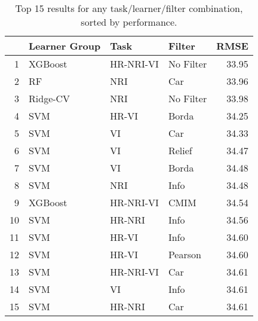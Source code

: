 \begin{table}[h!]
\centering
\caption{Top 15 results for any task/learner/filter combination, sorted by performance.} 
\label{tab:perf-top-15}
\begin{tabular}{rlllr}
  \hline
 & Learner Group & Task & Filter & RMSE \\ 
  \hline
1 & XGBoost & HR-NRI-VI & No Filter & 33.95 \\ 
  2 & RF & NRI & Car & 33.96 \\ 
  3 & Ridge-CV & NRI & No Filter & 33.98 \\ 
  4 & SVM & HR-VI & Borda & 34.25 \\ 
  5 & SVM & VI & Car & 34.33 \\ 
  6 & SVM & VI & Relief & 34.47 \\ 
  7 & SVM & VI & Borda & 34.48 \\ 
  8 & SVM & NRI & Info & 34.48 \\ 
  9 & XGBoost & HR-NRI-VI & CMIM & 34.54 \\ 
  10 & SVM & HR-NRI & Info & 34.56 \\ 
  11 & SVM & HR-VI & Info & 34.60 \\ 
  12 & SVM & HR-VI & Pearson & 34.60 \\ 
  13 & SVM & HR-NRI-VI & Car & 34.61 \\ 
  14 & SVM & VI & Info & 34.61 \\ 
  15 & SVM & HR-NRI & Car & 34.61 \\ 
   \hline
\end{tabular}
\end{table}
